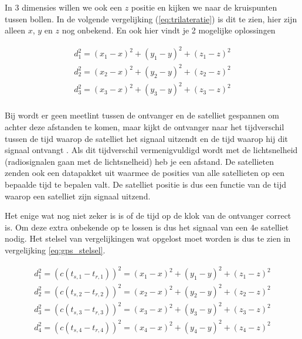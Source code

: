 In 3 dimensies willen we ook een $z$ positie en kijken we naar de
kruispunten tussen bollen. In de volgende vergelijking
(\ref{eq:trilateratie}) is dit te zien, hier zijn alleen $x$, $y$ en $z$
nog onbekend. En ook hier vindt je 2 mogelijke oplossingen

\begin{equation}
    \label{eq:trilateratie}
    \begin{array}{rcl}
         d_1^2 = (x_1-x)^2+(y_1-y)^2+(z_1-z)^2 \\
         d_2^2 = (x_2-x)^2+(y_2-y)^2+(z_2-z)^2 \\
         d_3^2 = (x_3-x)^2+(y_3-y)^2+(z_3-z)^2 \\
    \end{array}
\end{equation}

Bij \gps wordt er geen meetlint tussen de ontvanger en de satelliet
gespannen om achter deze afstanden te komen, maar kijkt de ontvanger
naar het tijdverschil tussen de tijd waarop de \gps satelliet het
signaal uitzendt en de tijd waarop hij dit signaal ontvangt
\cite{blewitt1997gps}. Als dit tijdverschil vermenigvuldigd wordt met de
lichtsnelheid (radiosignalen gaan met de lichtsnelheid) heb je een
afstand. De \gps satellieten zenden ook een datapakket uit waarmee de
posities van alle \gps satellieten op een bepaalde tijd te bepalen valt.
De \gps satelliet positie is dus een functie van de tijd waarop een
satelliet zijn signaal uitzend.

Het enige wat nog niet zeker is is of de tijd op de klok van de
ontvanger correct is. Om deze extra onbekende op te lossen is dus het
signaal van een 4e satelliet nodig. Het stelsel van vergelijkingen wat
opgelost moet worden is dus te zien in vergelijking \ref{eq:gps_stelsel}.

\begin{equation}
    \label{eq:gps_stelsel}
    \begin{array}{rcl}
        d_1^2 = (c(t_{s,1}-t_{r,1}))^2 = (x_1-x)^2+(y_1-y)^2+(z_1-z)^2 \\
        d_2^2 = (c(t_{s,2}-t_{r,2}))^2 = (x_2-x)^2+(y_2-y)^2+(z_2-z)^2 \\
        d_3^2 = (c(t_{s,3}-t_{r,3}))^2 = (x_3-x)^2+(y_3-y)^2+(z_3-z)^2 \\
        d_4^2 = (c(t_{s,4}-t_{r,4}))^2 = (x_4-x)^2+(y_4-y)^2+(z_4-z)^2 \\
    \end{array}
\end{equation}

